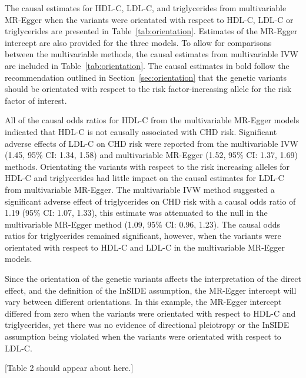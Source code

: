\documentclass[a4paper,12pt]{article}
\begin{document}
\begin{bibunit}[wileyj]
The causal estimates for HDL-C, LDL-C, and triglycerides from multivariable MR-Egger when the variants were orientated with respect to HDL-C, LDL-C or triglycerides are presented in Table~\ref{tab:orientation}. Estimates of the MR-Egger intercept are also provided for the three models. To allow for comparisons between the multivariable methods, the causal estimates from multivariable IVW are included in Table~\ref{tab:orientation}. The causal estimates in bold follow the recommendation outlined in Section~\ref{sec:orientation} that the genetic variants should be orientated with respect to the risk factor-increasing allele for the risk factor of interest.  

All of the causal odds ratios for HDL-C from the multivariable MR-Egger models indicated that HDL-C is not causally associated with CHD risk.  
Significant adverse effects of LDL-C on CHD risk were reported from the multivariable IVW (1.45, 95\% CI: 1.34, 1.58) and multivariable MR-Egger (1.52, 95\% CI: 1.37, 1.69) methods. Orientating the variants with respect to the risk increasing alleles for HDL-C and triglycerides had little impact on the causal estimates for LDL-C from multivariable MR-Egger. The multivariable IVW method suggested a significant adverse effect of triglycerides on CHD risk with a causal odds ratio of 1.19 (95\% CI: 1.07, 1.33), this estimate was attenuated to the null in the multivariable MR-Egger method (1.09, 95\% CI: 0.96, 1.23). The causal odds ratios for triglycerides remained significant, however, when the variants were orientated with respect to HDL-C and LDL-C in the multivariable MR-Egger models.   

Since the orientation of the genetic variants affects the interpretation of the direct effect, and the definition of the InSIDE assumption, the MR-Egger intercept will vary between different orientations. In this example, the MR-Egger intercept differed from zero when the variants were orientated with respect to HDL-C and triglycerides, yet there was no evidence of directional pleiotropy or the InSIDE assumption being violated when the variants were orientated with respect to LDL-C.  

\begin{center}
[Table 2 should appear about here.]
\end{center}

\pagebreak

\end{bibunit}
\end{document}
